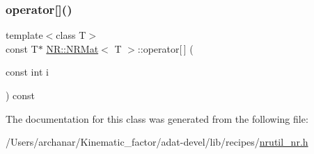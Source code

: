 \mbox{\label{classNR_1_1NRMat_a260aec593a5ef0c2166f6f4816ddfd2c}} 
\subsubsection{\texorpdfstring{operator[]()}{operator[]()}\hspace{0.1cm}{\footnotesize\ttfamily [6/6]}}
{\footnotesize\ttfamily template$<$class T$>$ \\
const T$\ast$ \mbox{\hyperlink{classNR_1_1NRMat}{N\+R\+::\+N\+R\+Mat}}$<$ T $>$\+::operator\mbox{[}$\,$\mbox{]} (\begin{DoxyParamCaption}\item[{const int}]{i }\end{DoxyParamCaption}) const\hspace{0.3cm}{\ttfamily [inline]}}



The documentation for this class was generated from the following file\+:\begin{DoxyCompactItemize}
\item 
/\+Users/archanar/\+Kinematic\+\_\+factor/adat-\/devel/lib/recipes/\mbox{\hyperlink{adat-devel_2lib_2recipes_2nrutil__nr_8h}{nrutil\+\_\+nr.\+h}}\end{DoxyCompactItemize}
